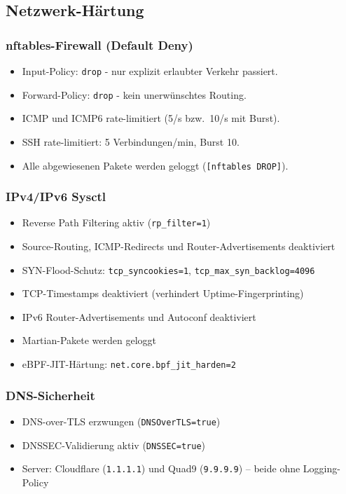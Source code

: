 \subsection{Netzwerk-Härtung}
\subsubsection*{nftables-Firewall (Default Deny)}
\begin{itemize}
  \item Input-Policy: \texttt{drop} - nur explizit erlaubter Verkehr passiert.
  \item Forward-Policy: \texttt{drop} - kein unerwünschtes Routing.
  \item ICMP und ICMP6 rate-limitiert (5/s bzw.\ 10/s mit Burst).
  \item SSH rate-limitiert: 5 Verbindungen/min, Burst 10.
  \item Alle abgewiesenen Pakete werden geloggt (\texttt{[nftables DROP]}).
\end{itemize}

\subsubsection*{IPv4/IPv6 Sysctl}
\begin{itemize}
  \item Reverse Path Filtering aktiv (\texttt{rp\_filter=1})
  \item Source-Routing, ICMP-Redirects und Router-Advertisements deaktiviert
  \item SYN-Flood-Schutz: \texttt{tcp\_syncookies=1}, \texttt{tcp\_max\_syn\_backlog=4096}
  \item \acs{TCP}-Timestamps deaktiviert (verhindert Uptime-Fingerprinting)
  \item IPv6 Router-Advertisements und Autoconf deaktiviert
  \item Martian-Pakete werden geloggt
  \item eBPF-JIT-Härtung: \texttt{net.core.bpf\_jit\_harden=2}
\end{itemize}

\subsubsection*{DNS-Sicherheit}
\begin{itemize}
  \item DNS-over-TLS erzwungen (\texttt{DNSOverTLS=true})
  \item DNSSEC-Validierung aktiv (\texttt{DNSSEC=true})
  \item Server: Cloudflare (\texttt{1.1.1.1}) und Quad9 (\texttt{9.9.9.9}) -- beide ohne Logging-Policy
\end{itemize}

